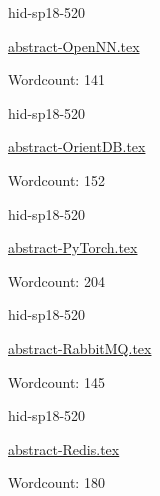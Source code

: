 

\begin{IU}

hid-sp18-520

\href{https://github.com/cloudmesh-community/hid-sp18-520/blob/master//technology/abstract-OpenNN.tex}{abstract-OpenNN.tex}

 

Wordcount: 141

\end{IU}



\begin{IU}

hid-sp18-520

\href{https://github.com/cloudmesh-community/hid-sp18-520/blob/master//technology/abstract-OrientDB.tex}{abstract-OrientDB.tex}

 

Wordcount: 152

\end{IU}



\begin{IU}

hid-sp18-520

\href{https://github.com/cloudmesh-community/hid-sp18-520/blob/master//technology/abstract-PyTorch.tex}{abstract-PyTorch.tex}

 

Wordcount: 204

\end{IU}



\begin{IU}

hid-sp18-520

\href{https://github.com/cloudmesh-community/hid-sp18-520/blob/master//technology/abstract-RabbitMQ.tex}{abstract-RabbitMQ.tex}

 

Wordcount: 145

\end{IU}



\begin{IU}

hid-sp18-520

\href{https://github.com/cloudmesh-community/hid-sp18-520/blob/master//technology/abstract-Redis.tex}{abstract-Redis.tex}

 

Wordcount: 180

\end{IU}

